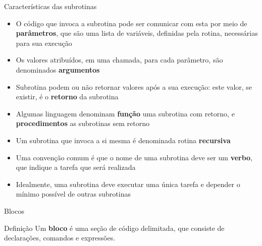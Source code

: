 \begin{frame}[fragile]{Características das subrotinas}

    \begin{itemize}

        \item O código que invoca a subrotina pode ser comunicar com esta por meio de 
            \textbf{parâmetros}, que são uma lista de variáveis, definidas pela rotina, necessárias
            para sua execução

        \item Os valores atribuídos, em uma chamada, para cada parâmetro, são denominados
            \textbf{argumentos}

        \item Subrotina podem ou não retornar valores após a sua execução: este valor, se existir,              é o \textbf{retorno} da subrotina

        \item Algumas linguagem denominam \textbf{função} uma subrotina com retorno, e 
            \textbf{procedimentos} as subrotinas sem retorno

        \item Um subrotina que invoca a si mesma é denominada rotina \textbf{recursiva}

        \item Uma convenção comum é que o nome de uma subrotina deve ser um \textbf{verbo}, que
            indique a tarefa que será realizada

        \item Idealmente, uma subrotina deve executar uma única tarefa e depender o mínimo possível
            de outras subrotinas
    \end{itemize}

\end{frame}

\begin{frame}[fragile]{Blocos}

    \begin{block}{Definição}
        Um \textbf{bloco} é uma seção de código delimitada, que consiste de declarações, comandos
            e expressões.
    \end{block}

\end{frame}

